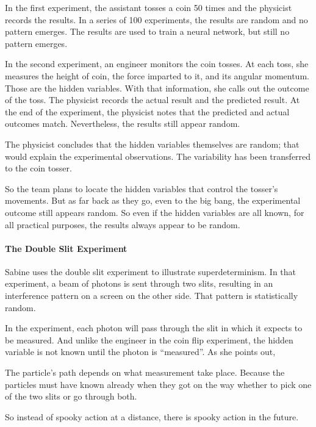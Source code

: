In the first experiment, the assistant tosses a coin 50 times and the physicist records the results. In a series of 100 experiments, the results are random and no pattern emerges. The results are used to train a neural network, but still no pattern emerges.

In the second experiment, an engineer monitors the coin tosses. At each toss, she measures the height of coin, the force imparted to it, and its angular momentum. Those are the hidden variables. With that information, she calls out the outcome of the toss. The physicist records the actual result and the predicted result. At the end of the experiment, the physicist notes that the predicted and actual outcomes match. Nevertheless, the results still appear random.

The physicist concludes that the hidden variables themselves are random; that would explain the experimental observations. The variability has been transferred to the coin tosser.

So the team plans to locate the hidden variables that control the tosser's movements. But as far back as they go, even to the big bang, the experimental outcome still appears random. So even if the hidden variables are all known, for all practical purposes, the results always appear to be random.

\paragraph{The Double Slit Experiment}


Sabine uses the double slit experiment to illustrate superdeterminism. In that experiment, a beam of photons is sent through two slits, resulting in an interference pattern on a screen on the other side. That pattern is statistically random.

In the experiment, each photon will pass through the slit in which it expects to be measured. And unlike the engineer in the coin flip experiment, the hidden variable is not known until the photon is ``measured''. As she points out,

\begin{quotex}
The particle's path depends on what measurement take place. Because the particles must have known already when they got on the way whether to pick one of the two slits or go through both.
\end{quotex}


So instead of spooky action at a distance, there is spooky action in the future.


